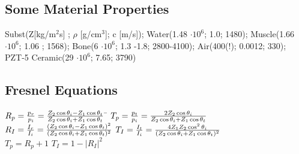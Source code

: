 \documentclass[9pt]{article}
\begin{document}
\begin{multicols}{2}
\subsection{Some Material Properties}
Subst(Z[kg/m${}^2$s] ; $\rho$ [g/cm${}^3$]; c [m/s]); Water(1.48 $\cdot 10^6$; 1.0;	1480); Muscle(1.66 $\cdot 10^6$; 1.06	; 1568); Bone(6	 $\cdot 10^6$; 1.3	-1.8; 2800-4100); Air(400(!); 0.0012; 330); PZT-5 Ceramic(29	$\cdot 10^6$; 7.65; 3790)


\subsection{Fresnel Equations}
\begin{tabbing}
$R_p = {p_r \over p_i} = \frac{Z_2 \cos\theta_i - Z_1 \cos\theta_t}{Z_2\cos\theta_i + Z_1\cos\theta_t}$
\hspace{5mm} \= $T_p = {p_t \over p_i} = \frac{2 Z_2 \cos\theta_i}{Z_2\cos\theta_i + Z_1\cos\theta_t}$ \\
$R_I = {I_r \over I_i} = \frac{(Z_2 \cos\theta_i - Z_1 \cos\theta_t)^2}{(Z_2\cos\theta_i + Z_1\cos\theta_t)^2}$
\> $T_I = {I_t \over I_i} = \frac{4Z_1Z_2\cos^2\theta_i}{(Z_2\cos\theta_i + Z_1\cos\theta_t)^2}$ \\
$T_p = R_p + 1$
\> $T_I = 1-|R_I|^2$ \\
\end{tabbing}
\vspace{-4mm}

\end{multicols}
\end{document}
